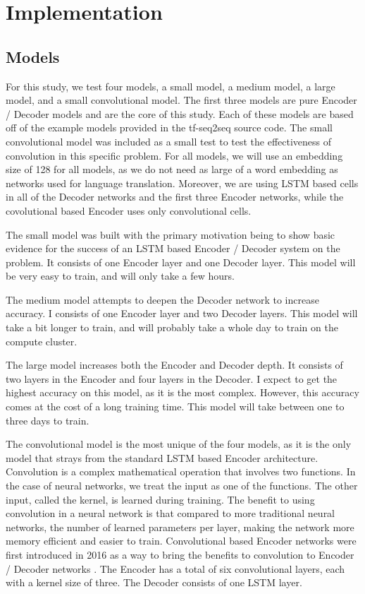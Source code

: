 \documentclass[pageno]{jpaper}
\begin{document}
\section{Implementation}

\subsection{Models}
For this study, we test four models, a small model, a medium model, a large model, and a small convolutional model.  The first three models are pure Encoder / Decoder models and are the core of this study.  Each of these models are based off of the example models provided in the tf-seq2seq source code.  The small convolutional model was included as a small test to test the effectiveness of convolution in this specific problem.  For all models, we will use an embedding size of 128 for all models, as we do not need as large of a word embedding as networks used for language translation.  Moreover, we are using LSTM based cells in all of the Decoder networks and the first three Encoder networks, while the covolutional based Encoder uses only convolutional cells.

\par
The small model was built with the primary motivation being to show basic evidence for the success of an LSTM based Encoder / Decoder system on the problem.  It consists of one Encoder layer and one Decoder layer.  This model will be very easy to train, and will only take a few hours.

\par
The medium model attempts to deepen the Decoder network to increase accuracy.  I consists of one Encoder layer and two Decoder layers.  This model will take a bit longer to train, and will probably take a whole day to train on the compute cluster. 

\par
The large model increases both the Encoder and Decoder depth.  It consists of two layers in the Encoder and four layers in the Decoder.  I expect to get the highest accuracy on this model, as it is the most complex.  However, this accuracy comes at the cost of a long training time. This model will take between one to three days to train.

\par
The convolutional model is the most unique of the four models, as it is the only model that strays from the standard LSTM based Encoder architecture.  Convolution is a complex mathematical operation that involves two functions.  In the case of neural networks, we treat the input as one of the functions.  The other input, called the kernel, is learned during training.  The benefit to using convolution in a neural network is that compared to more traditional neural networks, the number of learned parameters per layer, making the network more memory efficient and easier to train.  Convolutional based Encoder networks were first introduced in 2016 as a way to bring the benefits to convolution to Encoder / Decoder networks \cite{gehring:2016}.  The Encoder has a total of six convolutional layers, each with a kernel size of three.  The Decoder consists of one LSTM layer.
\end{document}
